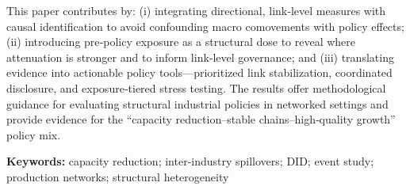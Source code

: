 This paper contributes by: (i) integrating directional, link‐level measures with causal identification to avoid confounding macro comovements with policy effects; (ii) introducing pre‐policy exposure as a structural dose to reveal where attenuation is stronger and to inform link‐level governance; and (iii) translating evidence into actionable policy tools—prioritized link stabilization, coordinated disclosure, and exposure‐tiered stress testing. The results offer methodological guidance for evaluating structural industrial policies in networked settings and provide evidence for the “capacity reduction–stable chains–high‐quality growth” policy mix.

\vspace{0.5em}
\noindent\textbf{Keywords:} capacity reduction; inter‐industry spillovers; DID; event study; production networks; structural heterogeneity
